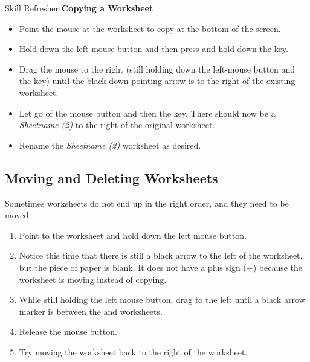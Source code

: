 \begin{center}
	\begin{sklbox}{Skill Refresher}
		\textbf{Copying a Worksheet}
		\\
		\begin{itemize}
			\setlength{\itemsep}{0pt}
			\setlength{\parskip}{0pt}
			\setlength{\parsep}{0pt}
			
			\item Point the mouse at the worksheet to copy at the bottom of the screen.
			\item Hold down the left mouse button and then press and hold down the  key.
			\item Drag the mouse to the right (still holding down the left-mouse button and the  key) until the black down-pointing arrow is to the right of the existing worksheet.
			\item Let go of the mouse button and then the  key. There should now be a \textit{Sheetname (2)} to the right of the original worksheet.
			\item Rename the \textit{Sheetname (2)} worksheet as desired.
			
		\end{itemize}
	\end{sklbox}
\end{center}

\subsection{Moving and Deleting Worksheets}

Sometimes worksheets do not end up in the right order, and they need to be moved.

\begin{enumerate}
	\item Point to the  worksheet and hold down the left mouse button.
	\item Notice this time that there is still a black arrow to the left of the  worksheet, but the piece of paper is blank. It does not have a plus sign ($ + $) because the worksheet is moving instead of copying.
	\item While still holding the left mouse button, drag to the left until a black arrow marker is between the  and  worksheets.
	\item Release the mouse button.
	\item Try moving the  worksheet back to the right of the  worksheet.
\end{enumerate}

